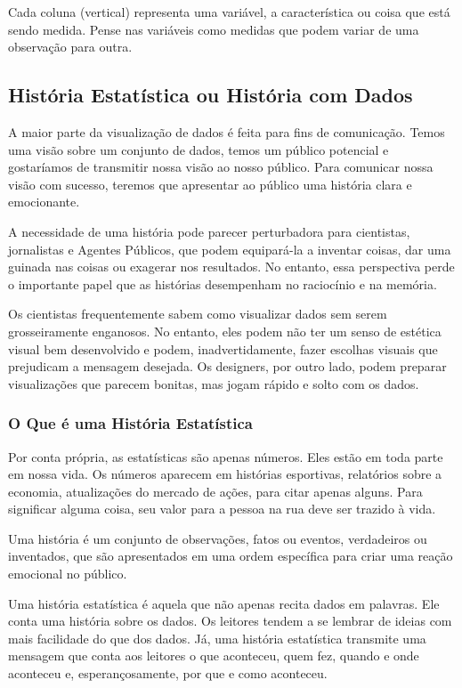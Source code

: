 Cada coluna (vertical) representa uma variável, a característica ou coisa que está sendo medida. Pense nas variáveis como medidas que podem variar de uma observação para outra.



\subsection{História Estatística ou História com Dados}

A maior parte da visualização de dados é feita para fins de comunicação. Temos uma visão sobre um conjunto de dados, temos um público potencial e gostaríamos de transmitir nossa visão ao nosso público. Para comunicar nossa visão com sucesso, teremos que apresentar ao público uma história clara e emocionante. \vskip0.3cm

A necessidade de uma história pode parecer perturbadora para cientistas, jornalistas e Agentes Públicos, que podem equipará-la a inventar coisas, dar uma guinada nas coisas ou exagerar nos resultados. No entanto, essa perspectiva perde o importante papel que as histórias desempenham no raciocínio e na memória.\vskip0.3cm

Os cientistas frequentemente sabem como visualizar dados sem serem grosseiramente enganosos. No entanto, eles podem não ter um senso de estética visual bem desenvolvido e podem, inadvertidamente, fazer escolhas visuais que prejudicam a mensagem desejada. Os designers, por outro lado, podem preparar visualizações que parecem bonitas, mas jogam rápido e solto com os dados. 

\subsubsection{O Que é uma História Estatística}

Por conta própria, as estatísticas são apenas números. Eles estão em toda parte em nossa vida. Os números aparecem em histórias esportivas, relatórios sobre a economia, atualizações do mercado de ações, para citar apenas alguns. Para significar alguma coisa, seu valor para a pessoa na rua deve ser trazido à vida.\vskip0.3cm 

Uma história é um conjunto de observações, fatos ou eventos, verdadeiros ou inventados, que são apresentados em uma ordem específica para criar uma reação emocional no público.\vskip0.3cm 

Uma história estatística é aquela que não apenas recita dados em palavras. Ele conta uma história sobre os dados. Os leitores tendem a se lembrar de ideias com mais facilidade do que dos dados. Já, uma história estatística transmite uma mensagem que conta aos leitores o que aconteceu, quem fez, quando e onde aconteceu e, esperançosamente, por que e como aconteceu.\vskip0.3cm 



